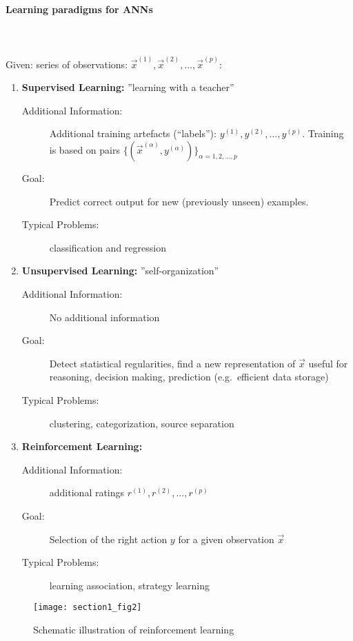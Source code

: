 \paragraph{Learning paradigms for ANNs}\mbox{}\\\\
Given: series of observations: $\vec{x}^{(1)}, \vec{x}^{(2)}, \ldots, \vec{x}^{(p)}$:
\begin{enumerate}[(1)]
\item {\bf Supervised Learning:} ''learning with a teacher''
  \begin{description}
  \item[Additional Information:] Additional training artefacts (``labels''): $y^{(1)}, y^{(2)}, \ldots, y^{(p)}$. Training is based on pairs $\{(\vec{x}^{(\alpha)},y^{(\alpha)})\}_{\alpha = 1, 2, ..., p}$
  \item[Goal:] Predict correct output for new (previously unseen) examples. 
  \item[Typical Problems:] classification and regression
  \end{description}
\item {\bf Unsupervised Learning:} ''self-organization''
  \begin{description}
    \item[Additional Information:] No additional information
    \item[Goal:] Detect statistical regularities, find a new representation of $\vec{x}$ useful for reasoning, decision making, prediction (e.g.\ efficient data storage)
      \item[Typical Problems:] clustering, categorization, source separation
  \end{description}
\item {\bf Reinforcement Learning:}
  \begin{description}
    \item[Additional Information:] additional ratings $r^{(1)}, r^{(2)}, \ldots, r^{(p)}$
    \item[Goal:] Selection of the right action $y$ for a given observation $\vec{x}$
    \item[Typical Problems:] learning association, strategy learning
  \end{description}
\end{enumerate}
\begin{figure}[h]
  \centering
\texttt{[image: section1\_fig2]}    
  \caption{Schematic illustration of reinforcement learning}
  \label{fig:reinforcementLearning}
\end{figure}

